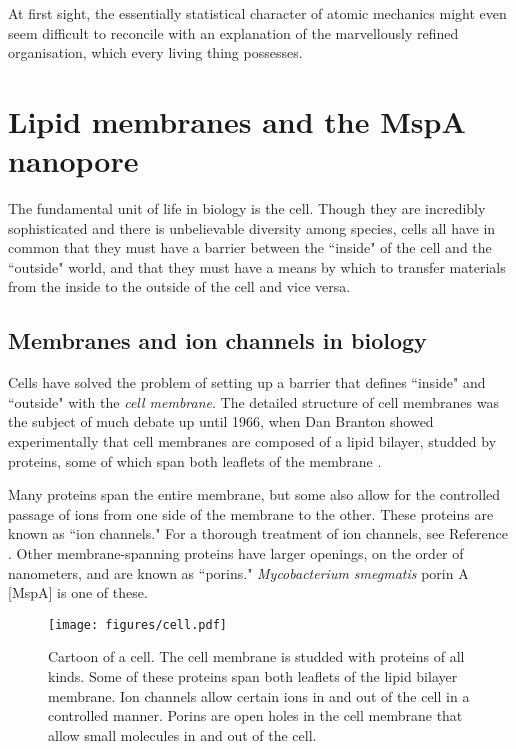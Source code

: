 \begin{savequote}[75mm]
At first sight, the essentially statistical character of atomic mechanics might even seem difficult to reconcile with an explanation of the marvellously refined organisation, which every living thing possesses.
\end{savequote}

\chapter{Lipid membranes and the MspA nanopore}
\label{lipids_mspa}

The fundamental unit of life in biology is the cell.  Though they are incredibly sophisticated and there is unbelievable diversity among species, cells all have in common that they must have a barrier between the ``inside" of the cell and the ``outside" world, and that they must have a means by which to transfer materials from the inside to the outside of the cell and vice versa.

\section{Membranes and ion channels in biology}

Cells have solved the problem of setting up a barrier that defines ``inside" and ``outside" with the \textit{cell membrane}.  The detailed structure of cell membranes was the subject of much debate up until 1966, when Dan Branton showed experimentally that cell membranes are composed of a lipid bilayer, studded by proteins, some of which span both leaflets of the membrane \citep{Branton1966}.

Many proteins span the entire membrane, but some also allow for the controlled passage of ions from one side of the membrane to the other.  These proteins are known as ``ion channels."  For a thorough treatment of ion channels, see Reference .  Other membrane-spanning proteins have larger openings, on the order of nanometers, and are known as ``porins."  \textit{Mycobacterium smegmatis} porin A [MspA] is one of these.

\begin{figure}[h]
\begin{centering}
\texttt{[image: figures/cell.pdf]}
\caption[Ion channels in cells]{Cartoon of a cell.  The cell membrane is studded with proteins of all kinds.  Some of these proteins span both leaflets of the lipid bilayer membrane.  Ion channels allow certain ions in and out of the cell in a controlled manner.  Porins are open holes in the cell membrane that allow small molecules in and out of the cell.}
\label{fig:ion_channels}
\end{centering}
\end{figure}


